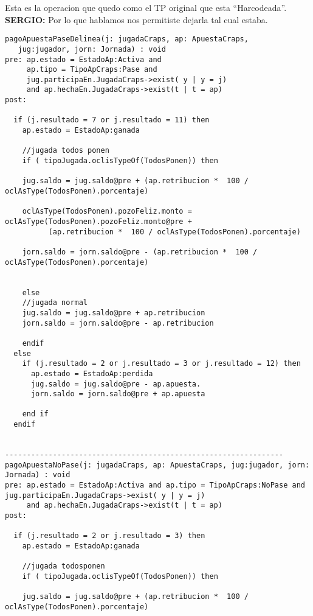 \begin{framed}
\depto Esta es la operacion que quedo como el TP original que esta ``Harcodeada''. \textbf{SERGIO: } Por lo que hablamos nos permitiste dejarla tal cual estaba.
\end{framed}

\begin{framed}
\begin{lstlisting}[breaklines=true]
pagoApuestaPaseDelinea(j: jugadaCraps, ap: ApuestaCraps, 
   jug:jugador, jorn: Jornada) : void
pre: ap.estado = EstadoAp:Activa and 
     ap.tipo = TipoApCraps:Pase and 
     jug.participaEn.JugadaCraps->exist( y | y = j) 
     and ap.hechaEn.JugadaCraps->exist(t | t = ap)
post:

  if (j.resultado = 7 or j.resultado = 11) then
    ap.estado = EstadoAp:ganada

    //jugada todos ponen
    if ( tipoJugada.oclisTypeOf(TodosPonen)) then 
    
    jug.saldo = jug.saldo@pre + (ap.retribucion *  100 / oclAsType(TodosPonen).porcentaje)
    
    oclAsType(TodosPonen).pozoFeliz.monto = oclAsType(TodosPonen).pozoFeliz.monto@pre + 
          (ap.retribucion *  100 / oclAsType(TodosPonen).porcentaje)

    jorn.saldo = jorn.saldo@pre - (ap.retribucion *  100 / oclAsType(TodosPonen).porcentaje)

    
    else
    //jugada normal
    jug.saldo = jug.saldo@pre + ap.retribucion
    jorn.saldo = jorn.saldo@pre - ap.retribucion

    endif
  else 
    if (j.resultado = 2 or j.resultado = 3 or j.resultado = 12) then
      ap.estado = EstadoAp:perdida
      jug.saldo = jug.saldo@pre - ap.apuesta.
      jorn.saldo = jorn.saldo@pre + ap.apuesta
  
    end if
  endif


----------------------------------------------------------------    
pagoApuestaNoPase(j: jugadaCraps, ap: ApuestaCraps, jug:jugador, jorn: Jornada) : void
pre: ap.estado = EstadoAp:Activa and ap.tipo = TipoApCraps:NoPase and jug.participaEn.JugadaCraps->exist( y | y = j) 
     and ap.hechaEn.JugadaCraps->exist(t | t = ap)
post:

  if (j.resultado = 2 or j.resultado = 3) then
    ap.estado = EstadoAp:ganada

    //jugada todosponen
    if ( tipoJugada.oclisTypeOf(TodosPonen)) then 
    
    jug.saldo = jug.saldo@pre + (ap.retribucion *  100 / oclAsType(TodosPonen).porcentaje)
    

\end{lstlisting}
\end{framed}
